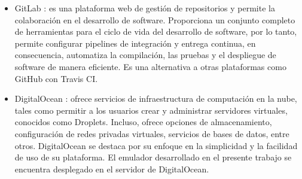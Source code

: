 \begin{itemize}
	\item GitLab \citep{GitLab}: es una plataforma web de gestión de repositorios y permite la colaboración en el desarrollo de software. Proporciona un conjunto completo de herramientas para el ciclo de vida del desarrollo de software, por lo tanto, permite configurar pipelines de integración y entrega continua, en consecuencia, automatiza la compilación, las pruebas y el despliegue de software de manera eficiente. Es una alternativa a otras plataformas como GitHub con Travis CI.
	
	\item DigitalOcean \citep{DigitalOcean}: ofrece servicios de infraestructura de computación en la nube, tales como permitir a los usuarios crear y administrar servidores virtuales, conocidos como Droplets. Incluso, ofrece opciones de almacenamiento, configuración de redes privadas virtuales, servicios de bases de datos, entre otros. DigitalOcean se destaca por su enfoque en la simplicidad y la facilidad de uso de su plataforma. El emulador desarrollado en el presente trabajo se encuentra desplegado en el servidor de DigitalOcean.

	
\end{itemize}
